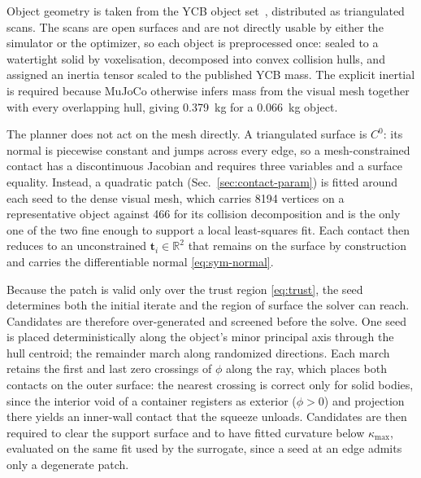 Object geometry is taken from the YCB object set~\cite{calli2015ycb}, distributed as
triangulated scans. The scans are open surfaces and are not directly usable by either
the simulator or the optimizer, so each object is preprocessed once: sealed to a
watertight solid by voxelisation, decomposed into convex collision hulls, and assigned
an inertia tensor scaled to the published YCB mass. The explicit inertial is required
because MuJoCo otherwise infers mass from the visual mesh together with every
overlapping hull, giving \SI{0.379}{\kilo\gram} for a \SI{0.066}{\kilo\gram} object.

The planner does not act on the mesh directly. A triangulated surface is $C^0$: its
normal is piecewise constant and jumps across every edge, so a mesh-constrained contact
has a discontinuous Jacobian and requires three variables and a surface equality.
Instead, a quadratic patch (Sec.~\ref{sec:contact-param}) is fitted around each seed to
the dense visual mesh, which carries \num{8194} vertices on a representative object
against \num{466} for its collision decomposition and is the only one of the two fine
enough to support a local least-squares fit. Each contact then reduces to an
unconstrained $\bm{t}_i \in \mathbb{R}^2$ that remains on the surface by construction
and carries the differentiable normal \eqref{eq:sym-normal}.

Because the patch is valid only over the trust region \eqref{eq:trust}, the seed
determines both the initial iterate and the region of surface the solver can reach.
Candidates are therefore over-generated and screened before the solve. One seed is
placed deterministically along the object's minor principal axis through the hull
centroid; the remainder march along randomized directions. Each march retains the
first and last zero crossings of $\phi$ along the ray, which places both contacts on
the outer surface: the nearest crossing is correct only for solid bodies, since the
interior void of a container registers as exterior ($\phi > 0$) and projection there
yields an inner-wall contact that the squeeze unloads. Candidates are then required to
clear the support surface and to have fitted curvature below $\kappa_{\max}$, evaluated
on the same fit used by the surrogate, since a seed at an edge admits only a degenerate
patch.

